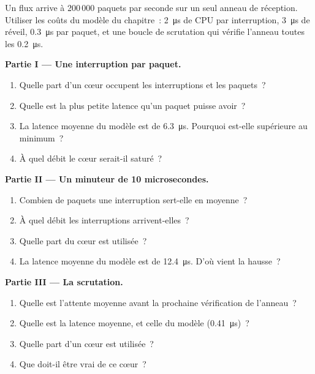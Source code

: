 \begin{problem}\label{pb:nw:network-cards-and-kernel-bypass:1}
Un flux arrive à 200\,000 paquets par seconde sur un seul anneau de réception. Utiliser les coûts du modèle du chapitre~: \qty{2}{\micro\second} de CPU par
interruption, \qty{3}{\micro\second} de réveil, \qty{0.3}{\micro\second} par paquet, et une boucle de scrutation qui vérifie l'anneau toutes les
\qty{0.2}{\micro\second}.

\medskip\noindent\textbf{Partie I --- Une interruption par paquet.}
\begin{enumerate}
\item Quelle part d'un cœur occupent les interruptions et les paquets~?
\item Quelle est la plus petite latence qu'un paquet puisse avoir~?
\item La latence moyenne du modèle est de \qty{6.3}{\micro\second}. Pourquoi est-elle supérieure au minimum~?
\item À quel débit le cœur serait-il saturé~?
\end{enumerate}

\medskip\noindent\textbf{Partie II --- Un minuteur de 10 microsecondes.}
\begin{enumerate}[resume]
\item Combien de paquets une interruption sert-elle en moyenne~?
\item À quel débit les interruptions arrivent-elles~?
\item Quelle part du cœur est utilisée~?
\item La latence moyenne du modèle est de \qty{12.4}{\micro\second}. D'où vient la hausse~?
\end{enumerate}

\medskip\noindent\textbf{Partie III --- La scrutation.}
\begin{enumerate}[resume]
\item Quelle est l'attente moyenne avant la prochaine vérification de l'anneau~?
\item Quelle est la latence moyenne, et celle du modèle (\qty{0.41}{\micro\second})~?
\item Quelle part d'un cœur est utilisée~?
\item Que doit-il être vrai de ce cœur~?
\end{enumerate}


\end{problem}
